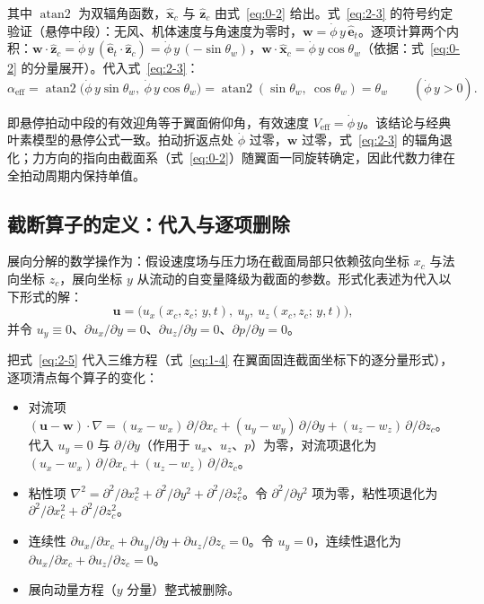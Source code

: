 \documentclass[11pt,a4paper]{ctexart}
\numberwithin{equation}{section}
\newcommand{\atan}{\operatorname{atan2}}
\begin{document}
其中 $\atan$ 为双辐角函数，$\hat{\bm{x}}_c$ 与 $\hat{\bm{z}}_c$ 由式~\eqref{eq:0-2} 给出。式~\eqref{eq:2-3} 的符号约定验证（悬停中段）：无风、机体速度与角速度为零时，$\bm{w} = \dot{\phi}\,y\,\hat{\bm{e}}_t$。逐项计算两个内积：$\bm{w}\cdot\hat{\bm{z}}_c = \dot{\phi}\,y\,(\hat{\bm{e}}_t\cdot\hat{\bm{z}}_c) = \dot{\phi}\,y\,(-\sin\theta_w)$，$\bm{w}\cdot\hat{\bm{x}}_c = \dot{\phi}\,y\cos\theta_w$（依据：式~\eqref{eq:0-2} 的分量展开）。代入式~\eqref{eq:2-3}：
\begin{equation}
  \alpha_{\text{eff}} = \atan\bigl(\dot{\phi}\,y\sin\theta_w,\ \dot{\phi}\,y\cos\theta_w\bigr)
  = \atan(\sin\theta_w,\ \cos\theta_w) = \theta_w \qquad (\dot{\phi}\,y > 0). \label{eq:2-4}
\end{equation}

即悬停拍动中段的有效迎角等于翼面俯仰角，有效速度 $V_{\text{eff}} = \dot{\phi}\,y$。该结论与经典叶素模型的悬停公式一致。拍动折返点处 $\dot{\phi}$ 过零，$\bm{w}$ 过零，式~\eqref{eq:2-3} 的辐角退化；力方向的指向由截面系（式~\eqref{eq:0-2}）随翼面一同旋转确定，因此代数力律在全拍动周期内保持单值。

\subsection{截断算子的定义：代入与逐项删除}

展向分解的数学操作为：假设速度场与压力场在截面局部只依赖弦向坐标 $x_c$ 与法向坐标 $z_c$，展向坐标 $y$ 从流动的自变量降级为截面的参数。形式化表述为代入以下形式的解：
\begin{equation}
  \bm{u} = \bigl(u_x(x_c, z_c;\, y, t),\ u_y,\ u_z(x_c, z_c;\, y, t)\bigr), \label{eq:2-5}
\end{equation}
并令 $u_y \equiv 0$、$\partial u_x/\partial y = 0$、$\partial u_z/\partial y = 0$、$\partial p/\partial y = 0$。

把式~\eqref{eq:2-5} 代入三维方程（式~\eqref{eq:1-4} 在翼面固连截面坐标下的逐分量形式），逐项清点每个算子的变化：

\begin{itemize}
  \item 对流项 $(\bm{u} - \bm{w})\cdot\nabla = (u_x - w_x)\,\partial/\partial x_c + (u_y - w_y)\,\partial/\partial y + (u_z - w_z)\,\partial/\partial z_c$。代入 $u_y = 0$ 与 $\partial/\partial y$（作用于 $u_x$、$u_z$、$p$）为零，对流项退化为 $(u_x - w_x)\,\partial/\partial x_c + (u_z - w_z)\,\partial/\partial z_c$。
  \item 粘性项 $\nabla^2 = \partial^2/\partial x_c^2 + \partial^2/\partial y^2 + \partial^2/\partial z_c^2$。令 $\partial^2/\partial y^2$ 项为零，粘性项退化为 $\partial^2/\partial x_c^2 + \partial^2/\partial z_c^2$。
  \item 连续性 $\partial u_x/\partial x_c + \partial u_y/\partial y + \partial u_z/\partial z_c = 0$。令 $u_y = 0$，连续性退化为 $\partial u_x/\partial x_c + \partial u_z/\partial z_c = 0$。
  \item 展向动量方程（$y$ 分量）整式被删除。
\end{itemize}
\end{document}
